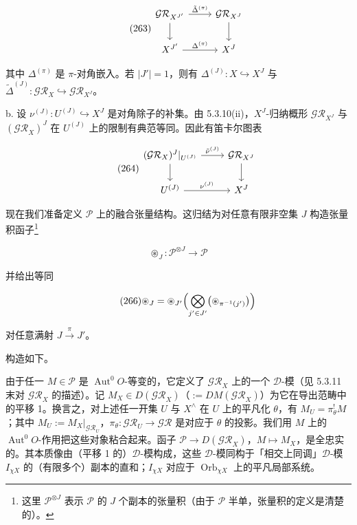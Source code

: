 \begin{equation}\tag{263}
\begin{tikzcd}
\mathcal{GR}_{X^{J'}} \arrow[r,"\tilde\Delta^{(\pi)}"] \arrow[d] & \mathcal{GR}_{X^{J}} \arrow[d]\\
X^{J'} \arrow[r,"\Delta^{(\pi)}"] & X^{J}
\end{tikzcd}
\end{equation}


其中 $\Delta^{(\pi)}$ 是 $\pi$-对角嵌入。若 $|J'|=1$，则有 $\Delta^{(J)}:X\hookrightarrow X^{J}$ 与 $\tilde\Delta^{(J)}:\mathcal{GR}_X\hookrightarrow\mathcal{GR}_{X^{J}}$。

b. 设 $\nu^{(J)}:U^{(J)}\hookrightarrow X^{J}$ 是对角除子的补集。由 5.3.10(ii)，$X^{J}$-归纳概形 $\mathcal{GR}_{X^{J}}$ 与 $(\mathcal{GR}_X)^{J}$ 在 $U^{(J)}$ 上的限制有典范等同。因此有笛卡尔图表

\begin{equation}\tag{264}
\begin{tikzcd}
(\mathcal{GR}_X)^{J}|_{U^{(J)}} \arrow[r,"\tilde\nu^{(J)}"] \arrow[d] & \mathcal{GR}_{X^{J}} \arrow[d]\\
U^{(J)} \arrow[r,"\nu^{(J)}"] & X^{J}
\end{tikzcd}
\end{equation}

 现在我们准备定义 $\mathcal{P}$ 上的融合张量结构。这归结为对任意有限非空集 $J$ 构造张量积函子\footnote{这里 $\mathcal{P}^{\otimes J}$ 表示 $\mathcal{P}$ 的 $J$ 个副本的张量积（由于 $\mathcal{P}$ 半单，张量积的定义是清楚的）。}

\begin{equation}\tag{265}
\circledast_J:\mathcal{P}^{\otimes J}\to\mathcal{P}
\end{equation}

并给出等同

\begin{equation}\tag{266}
\circledast_J=\circledast_{J'}\Bigl(\bigotimes_{j'\in J'}\bigl(\circledast_{\pi^{-1}(j')}\bigr)\Bigr)
\end{equation}

对任意满射 $J\xrightarrow{\pi}J'$。

构造如下。

 由于任一 $M\in\mathcal{P}$ 是 $\operatorname{Aut}^{0}O$-等变的，它定义了 $\mathcal{GR}_X$ 上的一个 $\mathcal{D}$-模（见 5.3.11 末对 $\mathcal{GR}_X$ 的描述）。记 $M_X\in D(\mathcal{GR}_X)$（$:=DM(\mathcal{GR}_X)$）为它在导出范畴中的平移 1。换言之，对上述任一开集 $U$ 与 $X^{\wedge}$ 在 $U$ 上的平凡化 $\theta$，有 $M_U=\pi_\theta^{!}M$；其中 $M_U:=M_X|_{\mathcal{GR}_U}$，$\pi_\theta:\mathcal{GR}_U\to\mathcal{GR}$ 是对应于 $\theta$ 的投影。我们用 $M$ 上的 $\operatorname{Aut}^{0}O$-作用把这些对象粘合起来。函子 $\mathcal{P}\to D(\mathcal{GR}_X)$，$M\mapsto M_X$，是全忠实的。其本质像由（平移 1 的）$\mathcal{D}$-模构成，这些 $\mathcal{D}$-模同构于「相交上同调」$\mathcal{D}$-模 $I_{\chi X}$ 的（有限多个）副本的直和；$I_{\chi X}$ 对应于 $\operatorname{Orb}_{\chi X}$ 上的平凡局部系统。

